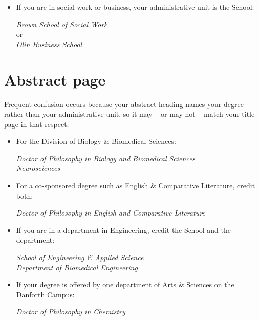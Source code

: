 \begin{itemize}
\item If you are in social work or business, your administrative unit is the School:
    \begin{center}
        \emph{Brown School of Social Work}\\
        or\\
        \emph{Olin Business School}
    \end{center}

\restoretrivseps
\end{itemize}

\section{Abstract page}
Frequent confusion occurs because your abstract heading names your degree rather than your administrative unit, so it may – or may not – match your title page in that respect.

\begin{itemize}
\zerotrivseps   %

\item For the Division of Biology \& Biomedical Sciences:
    \begin{center}
        \emph{Doctor of Philosophy in Biology and Biomedical Sciences}\\
        \emph{Neurosciences}
    \end{center}

\item For a co-sponsored degree such as English \& Comparative Literature, credit both:
    \begin{center}
        \emph{Doctor of Philosophy in English and Comparative Literature}
    \end{center}

\item If you are in a department in Engineering, credit the School and the department:
    \begin{center}
        \emph{School of Engineering \& Applied Science}\\
        \emph{Department of Biomedical Engineering}
    \end{center}

\item If your degree is offered by one department of Arts \& Sciences on the Danforth Campus:
    \begin{center}
        \emph{Doctor of Philosophy in Chemistry}
    \end{center}

\restoretrivseps
\end{itemize}
